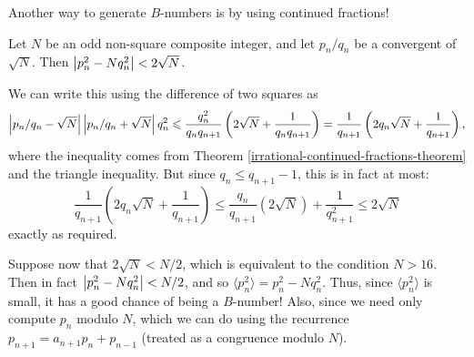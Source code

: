 \documentclass{article}
\begin{document}
Another way to generate $B$-numbers is by using continued fractions!

\begin{proposition}
    Let $N$ be an odd non-square composite integer, and let $p_n/q_n$ be a convergent of $\sqrt N$. Then $\left\lvert p_n^2 - N q_n^2 \right\rvert < 2 \sqrt N$.
\end{proposition}

\begin{prf}
    We can write this using the difference of two squares as
    \[
	\left\lvert p_n/q_n - \sqrt N \right\rvert \left\lvert p_n/q_n + \sqrt N \right\rvert q_n^2 \leqslant
	\frac{q_n^2}{q_n q_{n+1}} \left( 2 \sqrt N + \frac{1}{q_n q_{n+1}} \right) = 
	\frac{1}{q_{n+1}} \left( 2q_n \sqrt N + \frac{1}{q_{n+1}} \right),
	\]
	where the inequality comes from Theorem \ref{irrational-continued-fractions-theorem} and the triangle inequality. But since $q_n \leq q_{n+1} - 1$, this is in fact at most:
	\[
	\frac{1}{q_{n+1}} \left( 2q_n \sqrt N + \frac{1}{q_{n+1}} \right) \leq 
	\frac{q_n}{q_{n+1}} \left( 2 \sqrt N \right) + \frac{1}{q_{n+1}^2} \leq 2 \sqrt N
	\]
	exactly as required.
\end{prf}

\begin{corollary}
    Suppose now that $2 \sqrt N < N/2$, which is equivalent to the condition $N > 16$. Then in fact $\left\lvert p_n^2 - Nq_n^2 \right\rvert < N/2$, and so $\langle p_n^2 \rangle = p_n^2 - Nq_n^2$. Thus, since $\langle p_n^2 \rangle$ is small, it has a good chance of being a $B$-number! Also, since we need only compute $p_n$ modulo $N$, which we can do using the recurrence $p_{n+1} = a_{n+1} p_n + p_{n-1}$ (treated as a congruence modulo $N$).
\end{corollary}
\end{document}
